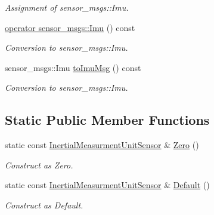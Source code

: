 \begin{DoxyCompactItemize}
\begin{DoxyCompactList}\small\item\em Assignment of sensor\+\_\+msgs\+::\+Imu. \end{DoxyCompactList}\item 
\hyperlink{classow__core_1_1InertialMeasurmentUnitSensor_ae75c3498fcfe06c3f38450cbe4ee7b56}{operator sensor\+\_\+msgs\+::\+Imu} () const \hypertarget{classow__core_1_1InertialMeasurmentUnitSensor_ae75c3498fcfe06c3f38450cbe4ee7b56}{}\label{classow__core_1_1InertialMeasurmentUnitSensor_ae75c3498fcfe06c3f38450cbe4ee7b56}

\begin{DoxyCompactList}\small\item\em Conversion to sensor\+\_\+msgs\+::\+Imu. \end{DoxyCompactList}\item 
sensor\+\_\+msgs\+::\+Imu \hyperlink{classow__core_1_1InertialMeasurmentUnitSensor_ae4359b46fbbabca9b504955e783c73e8}{to\+Imu\+Msg} () const \hypertarget{classow__core_1_1InertialMeasurmentUnitSensor_ae4359b46fbbabca9b504955e783c73e8}{}\label{classow__core_1_1InertialMeasurmentUnitSensor_ae4359b46fbbabca9b504955e783c73e8}

\begin{DoxyCompactList}\small\item\em Conversion to sensor\+\_\+msgs\+::\+Imu. \end{DoxyCompactList}\end{DoxyCompactItemize}
\subsection*{Static Public Member Functions}
\begin{DoxyCompactItemize}
\item 
static const \hyperlink{classow__core_1_1InertialMeasurmentUnitSensor}{Inertial\+Measurment\+Unit\+Sensor} \& \hyperlink{classow__core_1_1InertialMeasurmentUnitSensor_a574b74c38e0aad629492b1ff347fe6af}{Zero} ()\hypertarget{classow__core_1_1InertialMeasurmentUnitSensor_a574b74c38e0aad629492b1ff347fe6af}{}\label{classow__core_1_1InertialMeasurmentUnitSensor_a574b74c38e0aad629492b1ff347fe6af}

\begin{DoxyCompactList}\small\item\em Construct as Zero. \end{DoxyCompactList}\item 
static const \hyperlink{classow__core_1_1InertialMeasurmentUnitSensor}{Inertial\+Measurment\+Unit\+Sensor} \& \hyperlink{classow__core_1_1InertialMeasurmentUnitSensor_a98448e703f3f5e8998cbaef2405a477a}{Default} ()\hypertarget{classow__core_1_1InertialMeasurmentUnitSensor_a98448e703f3f5e8998cbaef2405a477a}{}\label{classow__core_1_1InertialMeasurmentUnitSensor_a98448e703f3f5e8998cbaef2405a477a}

\begin{DoxyCompactList}\small\item\em Construct as Default. \end{DoxyCompactList}\end{DoxyCompactItemize}
